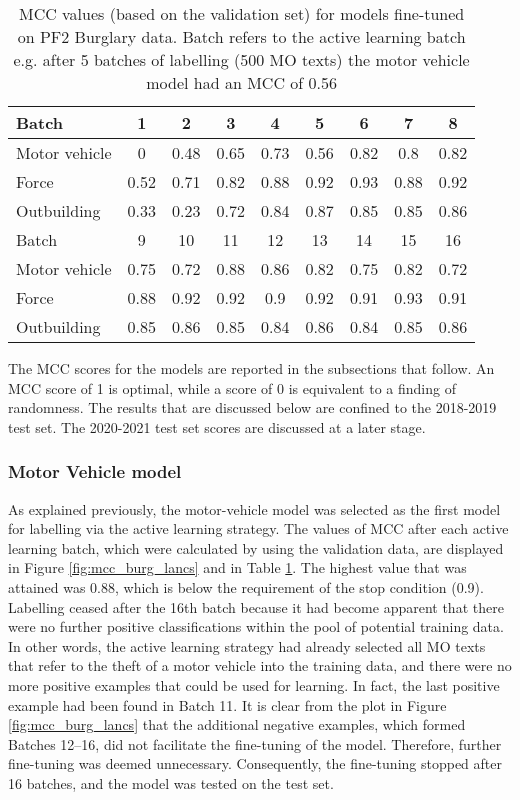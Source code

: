 \begin{table}[]
\centering
\begin{tabular}{@{}lcccccccc@{}}
\toprule
Batch       & 1    & 2    & 3    & 4    & 5    & 6    & 7    & 8    \\ \midrule
Motor vehicle          & 0    & 0.48 & 0.65 & 0.73 & 0.56 & 0.82 & 0.8  & 0.82 \\
Force       & 0.52 & 0.71 & 0.82 & 0.88 & 0.92 & 0.93 & 0.88 & 0.92 \\
Outbuilding & 0.33 & 0.23 & 0.72 & 0.84 & 0.87 & 0.85 & 0.85 & 0.86 \\\midrule
Batch       & 9    & 10   & 11   & 12   & 13   & 14   & 15   & 16   \\\midrule
Motor vehicle         & 0.75 & 0.72 & 0.88 & 0.86 & 0.82 & 0.75 & 0.82 & 0.72 \\
Force       & 0.88 & 0.92 & 0.92 & 0.9  & 0.92 & 0.91 & 0.93 & 0.91 \\
Outbuilding & 0.85 & 0.86 & 0.85 & 0.84 & 0.86 & 0.84 & 0.85 & 0.86 \\ \bottomrule
\end{tabular}
\caption[Batch metrics - PF2 data. All models]{\label{tab:results_1c}MCC values (based on the validation set) for models fine-tuned on PF2 Burglary data. Batch refers to the active learning batch e.g. after 5 batches of labelling (500 MO texts) the motor vehicle model had an MCC of 0.56 }
\end{table}


The MCC scores for the models are reported in the subsections that follow. An MCC score of 1 is optimal, while a score of 0 is equivalent to a finding of randomness. The results that are discussed below are confined to the 2018-2019 test set. The 2020-2021 test set scores are discussed at a later stage. 

\subsubsection{Motor Vehicle model} As explained previously, the motor-vehicle model was selected as the first model for labelling via the active learning strategy. The values of MCC after each active learning batch, which were calculated by using the validation data, are displayed in Figure \ref{fig:mcc_burg_lancs}  and in Table \ref{tab:results_1c}. The highest value that was attained was 0.88, which is below the requirement of the stop condition (0.9). Labelling ceased after the 16th batch because it had become apparent that there were no further positive classifications within the pool of potential training data. In other words, the active learning strategy had already selected all MO texts that refer to the theft of a motor vehicle into the training data, and there were no more positive examples that could be used for learning. In fact, the last positive example had been found in Batch 11. It is clear from the plot in Figure \ref{fig:mcc_burg_lancs} that the additional negative examples, which formed Batches 12–16, did not facilitate the fine-tuning of the model. Therefore, further fine-tuning was deemed unnecessary. Consequently, the fine-tuning stopped after 16 batches, and the model was tested on the test set.




